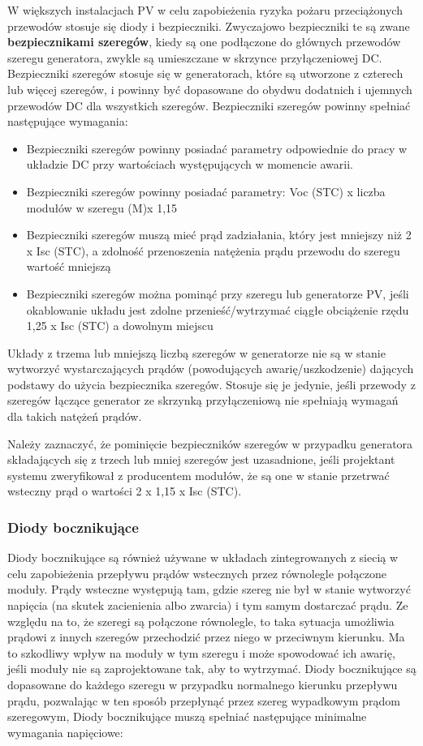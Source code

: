\documentclass[12pt,a4paper]{article}
\begin{document}
W większych instalacjach PV w celu zapobieżenia ryzyka pożaru 
przeciążonych przewodów stosuje się diody i bezpieczniki. Zwyczajowo 
bezpieczniki te są zwane \textbf{bezpiecznikami szeregów}, kiedy są one 
podłączone do głównych przewodów szeregu generatora, zwykle są 
umieszczane w skrzynce przyłączeniowej DC. Bezpieczniki szeregów stosuje 
się w generatorach, które są utworzone z czterech lub więcej szeregów, i 
powinny być dopasowane do obydwu dodatnich i ujemnych przewodów DC dla 
wszystkich szeregów. Bezpieczniki szeregów powinny spełniać następujące 
wymagania: 

\begin{itemize}
\item Bezpieczniki szeregów powinny posiadać parametry odpowiednie do 
pracy w układzie DC przy wartościach występujących w momencie awarii. 
\item Bezpieczniki szeregów powinny posiadać parametry: Voc (STC) x 
liczba modułów w szeregu (M)x 1,15 
\item Bezpieczniki szeregów muszą mieć prąd zadziałania, który jest 
mniejszy niż 2 x Isc (STC), a zdolność przenoszenia natężenia prądu 
przewodu do szeregu wartość mniejszą 
\item Bezpieczniki szeregów można pominąć przy szeregu lub generatorze 
PV, jeśli okablowanie układu jest zdolne przenieść/wytrzymać ciągłe 
obciążenie rzędu 1,25 x Isc (STC) a dowolnym miejscu 
\end{itemize}
 
Układy z trzema lub mniejszą liczbą szeregów w generatorze nie są w 
stanie wytworzyć wystarczających prądów (powodujących 
awarię/uszkodzenie) dających podstawy do użycia bezpiecznika szeregów. 
Stosuje się je jedynie, jeśli przewody z szeregów łączące generator ze 
skrzynką przyłączeniową nie spełniają wymagań dla takich natężeń prądów. 

Należy zaznaczyć, że pominięcie bezpieczników szeregów w przypadku 
generatora składających się z trzech lub mniej szeregów jest 
uzasadnione, jeśli projektant systemu zweryfikował z producentem 
modułów, że są one w stanie przetrwać wsteczny prąd o wartości 2 x 1,15 
x Isc (STC). 

\subsubsection{Diody bocznikujące}

Diody bocznikujące są również używane w układach zintegrowanych z siecią 
w celu zapobieżenia przepływu prądów wstecznych przez równolegle 
połączone moduły. Prądy wsteczne występują tam, gdzie szereg nie był w 
stanie wytworzyć napięcia (na skutek zacienienia albo zwarcia) i tym 
samym dostarczać prądu. Ze względu na to, że szeregi są połączone 
równolegle, to taka sytuacja umożliwia prądowi z innych szeregów 
przechodzić przez niego w przeciwnym kierunku. Ma to szkodliwy wpływ na 
moduły w tym szeregu i może spowodować ich awarię, jeśli moduły nie są 
zaprojektowane tak, aby to wytrzymać. Diody bocznikujące są dopasowane 
do każdego szeregu w przypadku normalnego kierunku przepływu prądu, 
pozwalając w ten sposób przepłynąć przez szereg wypadkowym prądom 
szeregowym, Diody bocznikujące muszą spełniać następujące minimalne 
wymagania napięciowe: 
\end{document}
